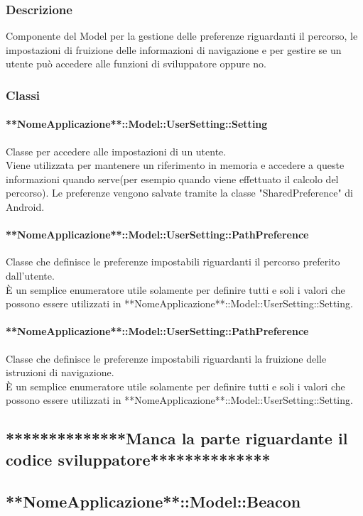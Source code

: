 \documentclass[../SpecificaTecnica.tex]{subfiles}
\begin{document}
		\subsubsection{Descrizione}
			Componente del Model per la gestione delle preferenze riguardanti il percorso, le impostazioni di fruizione delle informazioni di navigazione e per gestire se un utente può accedere alle funzioni di sviluppatore oppure no.
		\subsubsection{Classi}
			\paragraph{**NomeApplicazione**::Model::UserSetting::Setting}
				Classe per accedere alle impostazioni di un utente. \\
				Viene utilizzata per mantenere un riferimento in memoria e accedere a queste informazioni quando serve(per esempio quando viene effettuato il calcolo del percorso). Le preferenze vengono salvate tramite la classe "SharedPreference" di Android.
			\paragraph{**NomeApplicazione**::Model::UserSetting::PathPreference}
				Classe che definisce le preferenze impostabili riguardanti il percorso preferito dall'utente. \\
				È un semplice enumeratore utile solamente per definire tutti e soli i valori che possono essere utilizzati in **NomeApplicazione**::Model::UserSetting::Setting.
			\paragraph{**NomeApplicazione**::Model::UserSetting::PathPreference}
				Classe che definisce le preferenze impostabili riguardanti la fruizione delle istruzioni di navigazione. \\
				È un semplice enumeratore utile solamente per definire tutti e soli i valori che possono essere utilizzati in **NomeApplicazione**::Model::UserSetting::Setting.
	\subsection{**************Manca la parte riguardante il codice sviluppatore**************}
	\newpage
	\subsection{**NomeApplicazione**::Model::Beacon}
\end{document}
